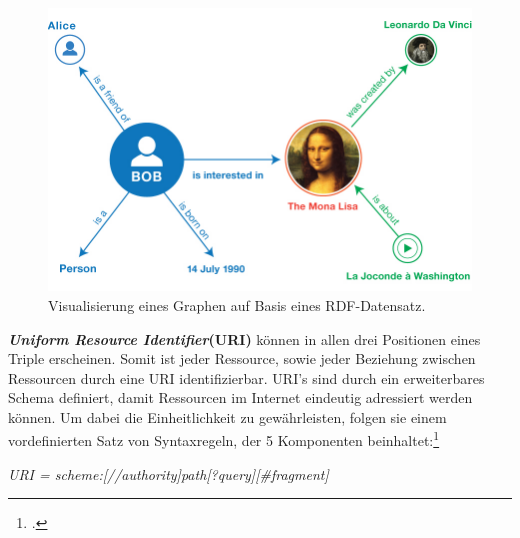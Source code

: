 \documentclass[12pt,a4paper]{article}
\begin{document}
\begin{figure}[h]
  \centering
	\includegraphics[width=1\textwidth]{img/rdf_example.png}  
    \caption[Visualisierung eines Graphen auf Basis eines RDF-Datensatz, \protect\url{https://www.w3.org/TR/rdf11-primer/}, 10.04.2019.]{Visualisierung eines Graphen auf Basis eines RDF-Datensatz.}
  	\label{fig:rdf_example}
\end{figure}
\textbf{\textit{Uniform Resource Identifier}(URI)} können in allen drei Positionen eines Triple erscheinen. Somit ist jeder Ressource, sowie jeder Beziehung zwischen Ressourcen durch eine URI identifizierbar. URI's sind durch ein erweiterbares Schema definiert, damit Ressourcen im Internet eindeutig adressiert werden können. Um dabei die Einheitlichkeit zu gewährleisten, folgen sie einem vordefinierten Satz von Syntaxregeln, der 5 Komponenten beinhaltet:\footcite[Vgl.][]{berners2004uniform}
\begin{center}
\textit{URI = scheme:[//authority]path[?query][\#fragment]}
\\
\end{center}
\end{document}
